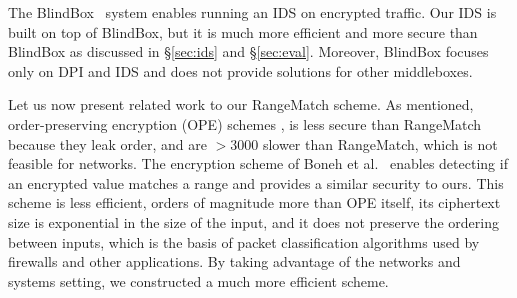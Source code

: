 The BlindBox~\cite{blindbox} system enables running an IDS on encrypted traffic. Our IDS is built on top of BlindBox, but it is much more efficient and more secure than BlindBox as discussed in \S\ref{sec:ids} and \S\ref{sec:eval}. Moreover, BlindBox focuses only on DPI and IDS and does not provide solutions for other middleboxes. %



Let us now present related work to our RangeMatch scheme. 
As  mentioned, order-preserving encryption  (OPE) schemes \cite{boldyreva:ope}, \cite{popa:mope} is less secure than RangeMatch because they leak order, and are $>3000$ slower than RangeMatch, which is not feasible for networks.
The  encryption scheme of Boneh et al.~\cite{BonehRange} enables detecting if an encrypted value matches a range and provides a similar security to ours. 
This scheme is less efficient, orders of magnitude more than OPE itself, its ciphertext size is exponential in the size of the input, and it does not preserve the ordering between inputs, which is the basis of packet classification algorithms used by firewalls and other applications. By taking advantage of the networks and systems setting, we constructed a much more efficient scheme. 








